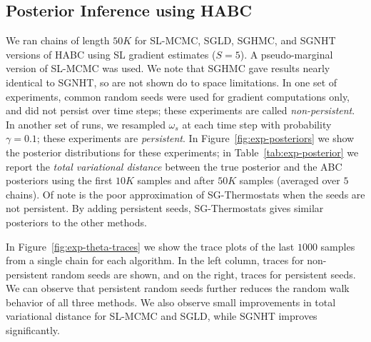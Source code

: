 \documentclass[]{article}
\begin{document}
\subsection{Posterior Inference using HABC}
We ran chains of length $50K$ for SL-MCMC, SGLD, SGHMC, and SGNHT versions of HABC using SL gradient estimates ($S=5$).  A pseudo-marginal version of SL-MCMC was used.  We note that SGHMC gave results nearly identical to SGNHT, so are not shown do to space limitations.   In one set of experiments, common random seeds were used for gradient computations only, and did not persist over time steps; these experiments are called {\em non-persistent}.  In another set of runs, we resampled $\omega_s$ at each time step with probability $\gamma = 0.1$; these experiments are {\em persistent}.  In Figure~\ref{fig:exp-posteriors} we show the posterior distributions for these experiments; in Table~\ref{tab:exp-posterior} we report the {\em total variational distance} between the true posterior and the ABC posteriors using the first $10K$ samples and after $50K$ samples (averaged over $5$ chains).  Of note is the poor approximation of SG-Thermostats when the seeds are not persistent.  By adding persistent seeds, SG-Thermostats gives similar posteriors to the other methods.

In Figure~\ref{fig:exp-theta-traces} we show the trace plots of the last $1000$ samples from a single chain for each algorithm.  In the left column, traces for non-persistent random seeds are shown, and on the right, traces for persistent seeds.  We can observe that persistent random seeds further reduces the random walk behavior of all three methods.  We also observe small improvements in total variational distance for SL-MCMC and SGLD, while SGNHT improves significantly.    

\end{document}
